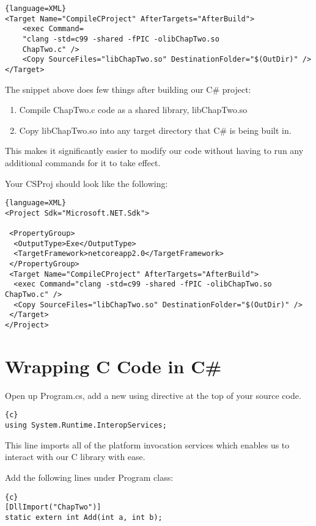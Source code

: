 \begin{lstlisting}{language=XML}
<Target Name="CompileCProject" AfterTargets="AfterBuild">
	<exec Command=
	"clang -std=c99 -shared -fPIC -olibChapTwo.so
	ChapTwo.c" />
	<Copy SourceFiles="libChapTwo.so" DestinationFolder="$(OutDir)" />
</Target>
\end{lstlisting}

The snippet above does few things after building our C\# project:
\begin{enumerate}
	\item Compile ChapTwo.c code as a shared library, libChapTwo.so
	\item Copy libChapTwo.so into any target directory that C\# is being built in.
\end{enumerate}

This makes it significantly easier to modify our code without having to run any additional commands for it to take effect.

Your CSProj should look like the following:

\begin{lstlisting}{language=XML}
<Project Sdk="Microsoft.NET.Sdk">

 <PropertyGroup>
  <OutputType>Exe</OutputType>
  <TargetFramework>netcoreapp2.0</TargetFramework>
 </PropertyGroup>
 <Target Name="CompileCProject" AfterTargets="AfterBuild">
  <exec Command="clang -std=c99 -shared -fPIC -olibChapTwo.so
ChapTwo.c" />
  <Copy SourceFiles="libChapTwo.so" DestinationFolder="$(OutDir)" />
 </Target>
</Project>
\end{lstlisting}
\newpage
\section{Wrapping C Code in C\#}
Open up Program.cs, add a new using directive at the top of your source code.

\begin{lstlisting}{c}
using System.Runtime.InteropServices;
\end{lstlisting}

This line imports all of the platform invocation services which enables us to interact with our C library with ease.

Add the following lines under Program class:

\begin{lstlisting}{c}
[DllImport("ChapTwo")]
static extern int Add(int a, int b);
\end{lstlisting}

